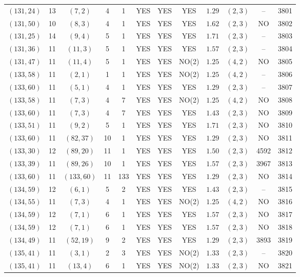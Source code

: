 \begin{longtable}{|c|c|c|c|c|c|c|c|c|c|c|c|}
$(131,24)$ & 13 & $(7,2)$ & 4 & 1 & YES & YES & YES & $1.29$ & $(2,3)$ & -- & 3801\\
$(131,50)$ & 10 & $(8,3)$ & 4 & 1 & YES & YES & YES & $1.62$ & $(2,3)$ & NO & 3802\\
$(131,25)$ & 14 & $(9,4)$ & 5 & 1 & YES & YES & YES & $1.71$ & $(2,3)$ & -- & 3803\\
$(131,36)$ & 11 & $(11,3)$ & 5 & 1 & YES & YES & YES & $1.57$ & $(2,3)$ & -- & 3804\\
$(131,47)$ & 11 & $(11,4)$ & 5 & 1 & YES & YES & NO(2) & $1.25$ & $(4,2)$ & NO & 3805\\
$(133,58)$ & 11 & $(2,1)$ & 1 & 1 & YES & YES & NO(2) & $1.25$ & $(4,2)$ & -- & 3806\\
$(133,60)$ & 11 & $(5,1)$ & 4 & 1 & YES & YES & YES & $1.29$ & $(2,3)$ & -- & 3807\\
$(133,58)$ & 11 & $(7,3)$ & 4 & 7 & YES & YES & NO(2) & $1.25$ & $(4,2)$ & NO & 3808\\
$(133,60)$ & 11 & $(7,3)$ & 4 & 7 & YES & YES & YES & $1.43$ & $(2,3)$ & NO & 3809\\
$(133,51)$ & 11 & $(9,2)$ & 5 & 1 & YES & YES & YES & $1.71$ & $(2,3)$ & NO & 3810\\
$(133,60)$ & 11 & $(82,37)$ & 10 & 1 & YES & YES & YES & $1.29$ & $(2,3)$ & NO & 3811\\
$(133,30)$ & 12 & $(89,20)$ & 11 & 1 & YES & YES & YES & $1.50$ & $(2,3)$ & 4592 & 3812\\
$(133,39)$ & 11 & $(89,26)$ & 10 & 1 & YES & YES & YES & $1.57$ & $(2,3)$ & 3967 & 3813\\
$(133,60)$ & 11 & $(133,60)$ & 11 & 133 & YES & YES & YES & $1.29$ & $(2,3)$ & NO & 3814\\
$(134,59)$ & 12 & $(6,1)$ & 5 & 2 & YES & YES & YES & $1.43$ & $(2,3)$ & -- & 3815\\
$(134,55)$ & 11 & $(7,3)$ & 4 & 1 & YES & YES & NO(2) & $1.25$ & $(4,2)$ & NO & 3816\\
$(134,59)$ & 12 & $(7,1)$ & 6 & 1 & YES & YES & YES & $1.57$ & $(2,3)$ & NO & 3817\\
$(134,59)$ & 12 & $(7,1)$ & 6 & 1 & YES & YES & YES & $1.57$ & $(2,3)$ & NO & 3818\\
$(134,49)$ & 11 & $(52,19)$ & 9 & 2 & YES & YES & YES & $1.29$ & $(2,3)$ & 3893 & 3819\\
$(135,41)$ & 11 & $(3,1)$ & 2 & 3 & YES & YES & NO(2) & $1.33$ & $(2,3)$ & -- & 3820\\
$(135,41)$ & 11 & $(13,4)$ & 6 & 1 & YES & YES & NO(2) & $1.33$ & $(2,3)$ & NO & 3821\\

\end{longtable}
